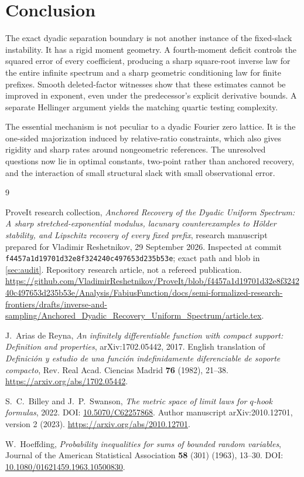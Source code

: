 \documentclass[11pt,a4paper]{article}
\numberwithin{equation}{section}
\theoremstyle{definition}
\theoremstyle{remark}
\newcommand{\repoSHA}{f4457a1d19701d32e8f324240c497653d235b53e}
\begin{document}
\section{Conclusion}

The exact dyadic separation boundary is not another instance of the
fixed-slack instability. It has a rigid moment geometry. A fourth-moment
deficit controls the squared error of every coefficient, producing a sharp
square-root inverse law for the entire infinite spectrum and a sharp
geometric conditioning law for finite prefixes. Smooth deleted-factor
witnesses show that these estimates cannot be improved in exponent, even
under the predecessor's explicit derivative bounds. A separate Hellinger
argument yields the matching quartic testing complexity.

The essential mechanism is not peculiar to a dyadic Fourier zero lattice.
It is the one-sided majorization induced by relative-ratio constraints,
which also gives rigidity and sharp rates around nongeometric references.
The unresolved questions now lie in optimal constants, two-point rather
than anchored recovery, and the interaction of small structural slack with
small observational error.

\clearpage
\begin{thebibliography}{9}
\raggedright

ProveIt research collection,
\emph{Anchored Recovery of the Dyadic Uniform Spectrum: A sharp
stretched-exponential modulus, lacunary counterexamples to H\"older stability,
and Lipschitz recovery of every fixed prefix},
research manuscript prepared for Vladimir Reshetnikov, 29 September 2026.
Inspected at commit \texttt{\repoSHA}; exact path and blob in
\cref{sec:audit}. Repository research article, not a refereed publication.
\url{https://github.com/VladimirReshetnikov/ProveIt/blob/f4457a1d19701d32e8f324240c497653d235b53e/Analysis/FabiusFunction/docs/semi-formalized-research-frontiers/drafts/inverse-and-sampling/Anchored_Dyadic_Recovery_Uniform_Spectrum/article.tex}.

J.~Arias de Reyna,
\emph{An infinitely differentiable function with compact support:
Definition and properties}, arXiv:1702.05442, 2017.
English translation of \emph{Definici\'on y estudio de una funci\'on
indefinidamente diferenciable de soporte compacto},
Rev. Real Acad. Ciencias Madrid \textbf{76} (1982), 21--38.
\url{https://arxiv.org/abs/1702.05442}.

S.~C.~Billey and J.~P.~Swanson,
\emph{The metric space of limit laws for $q$-hook formulas},
2022. DOI: \href{https://doi.org/10.5070/C62257868}{10.5070/C62257868}.
Author manuscript arXiv:2010.12701, version 2 (2023).
\url{https://arxiv.org/abs/2010.12701}.

W.~Hoeffding,
\emph{Probability inequalities for sums of bounded random variables},
Journal of the American Statistical Association \textbf{58} (301)
(1963), 13--30.
DOI: \href{https://doi.org/10.1080/01621459.1963.10500830}
{10.1080/01621459.1963.10500830}.

\end{thebibliography}
\end{document}
